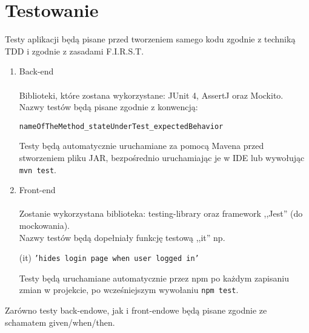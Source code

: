 \documentclass{article}
\begin{document}
\section{Testowanie}
{\fontsize{12}{12}\selectfont
Testy aplikacji będą pisane przed tworzeniem samego kodu zgodnie z techniką TDD i zgodnie z zasadami F.I.R.S.T.

\begin{enumerate}
    \item Back-end \\ \\
        Biblioteki, które zostana wykorzystane: JUnit 4, AssertJ oraz Mockito.\\

        Nazwy testów będą pisane zgodnie z konwencją:
                \begin{center}
                    \texttt{nameOfTheMethod\_stateUnderTest\_expectedBehavior}
                \end{center}
        Testy będą automatycznie uruchamiane za pomocą Mavena przed stworzeniem pliku JAR, bezpośrednio uruchamiając je w IDE lub wywołując \texttt{mvn test}.
        
    \item Front-end \\ \\
        Zostanie wykorzystana biblioteka: testing-library oraz framework ,,Jest'' (do mockowania). \\
        Nazwy testów będą dopełniały funkcję testową ,,it'' np. 
        \begin{center}
           (it) \texttt{'hides login page when user logged in'}
        \end{center}
        Testy będą uruchamiane automatycznie przez npm po każdym zapisaniu zmian w projekcie, po wcześniejszym wywołaniu \texttt{npm test}.
\end{enumerate}

    Zarówno testy back-endowe, jak i front-endowe będą pisane zgodnie ze schamatem given/when/then.
}
\end{document}

